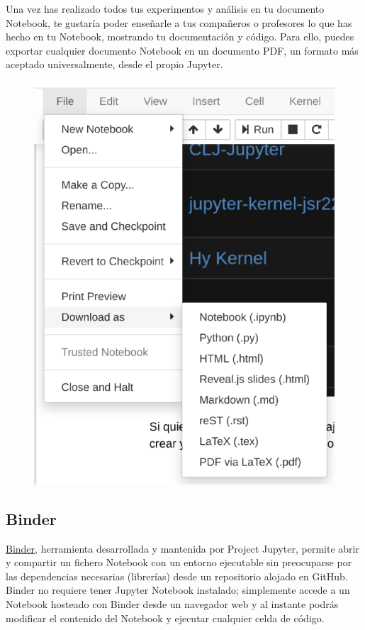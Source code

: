 \documentclass[11pt]{article}
\makeatletter
\def\maxwidth{\ifdim\Gin@nat@width>\linewidth\linewidth
    \else\Gin@nat@width\fi}
\let\Oldincludegraphics\includegraphics
\renewcommand{\includegraphics}[1]{\Oldincludegraphics[width=.8\maxwidth]{#1}}
\makeatother
\begin{document}
    Una vez has realizado todos tus experimentos y análisis en tu documento
Notebook, te gustaría poder enseñarle a tus compañeros o profesores lo
que has hecho en tu Notebook, mostrando tu documentación y código. Para
ello, puedes exportar cualquier documento Notebook en un documento PDF,
un formato más aceptado universalmente, desde el propio Jupyter.

    \begin{figure}
\centering
\includegraphics{export-pdf.png}
\caption{}
\end{figure}

    \subsection{Binder}\label{binder}

    \href{https://mybinder.org/}{Binder}, herramienta desarrollada y
mantenida por Project Jupyter, permite abrir y compartir un fichero
Notebook con un entorno ejecutable sin preocuparse por las dependencias
necesarias (librerías) desde un repositorio alojado en GitHub. Binder no
requiere tener Jupyter Notebook instalado; simplemente accede a un
Notebook hosteado con Binder desde un navegador web y al instante podrás
modificar el contenido del Notebook y ejecutar cualquier celda de
código.
\end{document}
